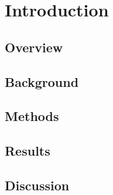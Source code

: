 \chapter{Introduction}


\section{Overview}

\section{Background}

\section{Methods}

\section{Results}

\section{Discussion}